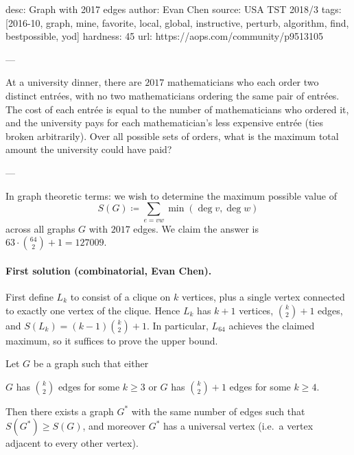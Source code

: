 desc: Graph with 2017 edges
author: Evan Chen
source: USA TST 2018/3
tags: [2016-10, graph, mine, favorite, local, global, instructive, perturb, algorithm,
  find, bestpossible, yod]
hardness: 45
url: https://aops.com/community/p9513105

---

At a university dinner,
there are $2017$ mathematicians who each order two distinct entr\'ees,
with no two mathematicians ordering the same pair of entr\'{e}es.
The cost of each entr\'ee is equal
to the number of mathematicians who ordered it,
and the university pays for each mathematician's
less expensive entr\'ee (ties broken arbitrarily).
Over all possible sets of orders,
what is the maximum total amount the university could have paid?

---

In graph theoretic terms:
we wish to determine the maximum possible value of
\[ S(G) \coloneqq \sum_{e = vw} \min \left( \deg v, \deg w \right) \]
across all graphs $G$ with $2017$ edges.
We claim the answer is $63 \cdot \binom{64}{2} + 1 = 127009$.

\paragraph{First solution (combinatorial, Evan Chen).}
First define $L_k$ to consist of a clique on $k$ vertices,
plus a single vertex connected to exactly one vertex of the clique.
Hence $L_k$ has $k+1$ vertices, $\binom k2+1$ edges,
and $S(L_k) = (k-1) \binom k2 + 1$.
In particular, $L_{64}$ achieves the claimed maximum,
so it suffices to prove the upper bound.

\begin{lemma*}
  Let $G$ be a graph such that either
  \begin{itemize}
    \ii $G$ has $\binom k2$ edges for some $k \ge 3$ or
    \ii $G$ has $\binom k2 + 1$ edges for some $k \ge 4$.
  \end{itemize}
  Then there exists a graph $G^\ast$ with the same number of edges
  such that $S(G^\ast) \ge S(G)$, and moreover $G^\ast$ has a universal vertex
  (i.e.\ a vertex adjacent to every other vertex).
\end{lemma*}

